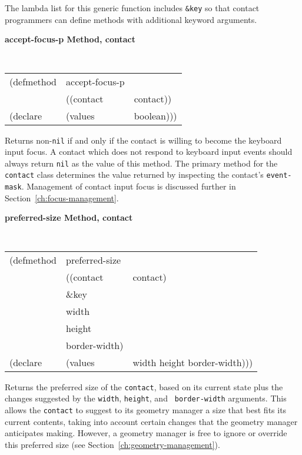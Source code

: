 \documentclass[twoside]{book}
\begin{document}
\begin{sloppy}
\begin{flushright}
{The lambda list for this generic function includes {\tt \&key} so that contact
programmers can define methods with additional keyword arguments.
}\end{flushright}


{\samepage
{\large {\bf accept-focus-p \hfill Method, contact}}
\begin{flushright}
\parbox[t]{6.125in}{
\tt
\begin{tabular}{lll}
\raggedright
(defmethod & accept-focus-p & \\
& ((contact  &contact)) \\
(declare & (values & boolean)))
\end{tabular}
\rm}
\end{flushright}
}

\begin{flushright}\parbox[t]{6.125in}{
Returns  non-{\tt nil} if and only if the contact is willing to become the
keyboard input focus. A contact which does not respond to keyboard input
events should always return {\tt nil} as the value of this method. The
primary method for the {\tt contact} class determines the value returned by
inspecting the contact's {\tt event-mask}. Management of
contact input focus is discussed further in Section~\ref{ch:focus-management}.

}\end{flushright}

{\samepage
{\large {\bf preferred-size \hfill Method, contact}}
\begin{flushright}
\parbox[t]{6.125in}{
\tt
\begin{tabular}{lll}
\raggedright
(defmethod & preferred-size & \\
& ((contact  &contact)\\
& \&key\\
&  width \\
&  height\\
&  border-width) \\
(declare & (values & width height border-width)))
\end{tabular}
\rm}
\end{flushright}
}

\begin{flushright}\parbox[t]{6.125in}{
Returns the preferred size of the {\tt contact}, based on its current state
plus the changes suggested by the {\tt width}, {\tt height}, and {\tt
border-width} arguments. This allows the {\tt contact} to suggest to its geometry
manager a size that best fits its current contents, taking into account
certain changes that the geometry manager anticipates making. However, a
geometry manager
is free to ignore or override this preferred size (see Section~\ref{ch:geometry-management}).}
\end{flushright}


\end{sloppy}
\end{document}
